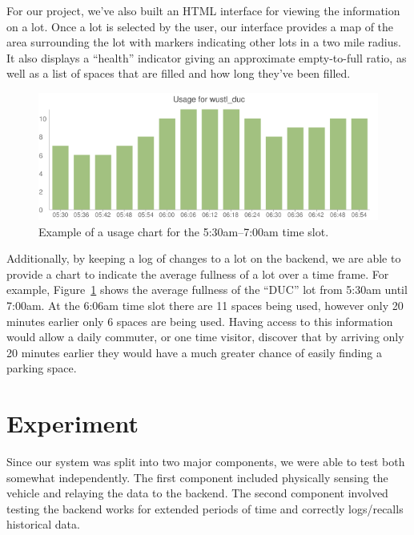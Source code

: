 \documentclass{acm_proc}
\begin{document}
For our project, we've also built an HTML interface for viewing the
information on a lot.
Once a lot is selected by the user, our interface provides a map of the
area surrounding the lot with markers indicating other lots in a two mile
radius.
It also displays a ``health'' indicator giving an approximate empty-to-full
ratio, as well as a list of spaces that are filled and how long they've
been filled.

\begin{figure}
    \begin{center}
		\includegraphics[width=\columnwidth]{figures/fullness-chart}
	\end{center}
	\caption{Example of a usage chart for the 5:30am--7:00am time slot.}
	\label{fig:fullness-chart}
\end{figure}

Additionally, by keeping a log of changes to a lot on the backend, we are
able to provide a chart to indicate the average fullness of a lot over a
time frame.
For example, Figure~\ref{fig:fullness-chart} shows the average fullness of
the ``DUC'' lot from 5:30am until 7:00am.
At the 6:06am time slot there are 11 spaces being used, however only 20
minutes earlier only 6 spaces are being used.
Having access to this information would allow a daily commuter, or one time
visitor, discover that by arriving only 20 minutes earlier they would have
a much greater chance of easily finding a parking space.

\section{Experiment}\label{sec:experiment}

Since our system was split into two major components, we were able to test
both somewhat independently. 
The first component included physically sensing the vehicle and relaying
the data to the backend.
The second component involved testing the backend works for extended
periods of time and correctly logs/recalls historical data.
\end{document}
